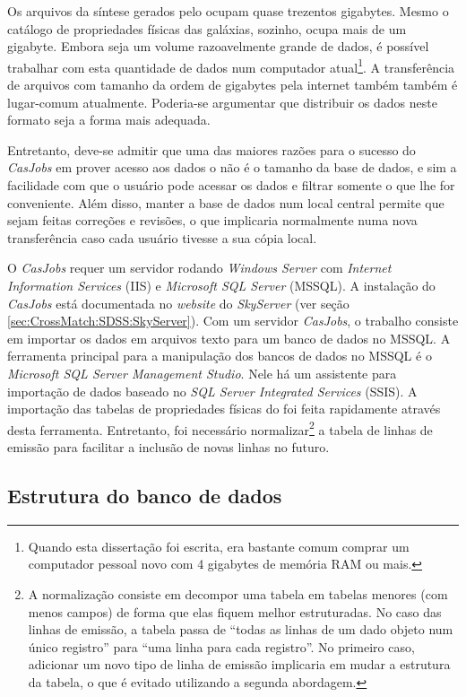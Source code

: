 Os arquivos da síntese gerados pelo \starlight ocupam quase trezentos gigabytes.
Mesmo o catálogo de propriedades físicas das galáxias, sozinho, ocupa mais de um
gigabyte. Embora seja um volume razoavelmente grande de dados, é possível
trabalhar com esta quantidade de dados num computador atual\footnote{Quando esta
dissertação foi escrita, era bastante comum comprar um computador pessoal novo
com 4 gigabytes de memória RAM ou mais.}. A transferência de arquivos com
tamanho da ordem de gigabytes pela internet também também é lugar-comum
atualmente. Poderia-se argumentar que distribuir os dados neste formato seja a
forma mais adequada.

Entretanto, deve-se admitir que uma das maiores razões para o sucesso do {\em
CasJobs} em prover acesso aos dados o \SDSS não é o tamanho da base de dados, e
sim a facilidade com que o usuário pode acessar os dados e filtrar somente o que
lhe for conveniente. Além disso, manter a base de dados num local central
permite que sejam feitas correções e revisões, o que implicaria normalmente numa
nova transferência caso cada usuário tivesse a sua cópia local.

O {\em CasJobs} requer um servidor rodando {\em Windows Server} com {\em
Internet Information Services} (IIS) e {\em Microsoft SQL Server} (MSSQL). A
instalação do {\em CasJobs} está documentada no {\em website} do {\em SkyServer}
(ver seção \ref{sec:CrossMatch:SDSS:SkyServer}). Com um servidor {\em CasJobs},
o trabalho consiste em importar os dados em arquivos texto para um banco de
dados no MSSQL. A ferramenta principal para a manipulação dos bancos de dados no
MSSQL é o {\em Microsoft SQL Server Management Studio}. Nele há um assistente
para importação de dados baseado no {\em SQL Server Integrated Services} (SSIS).
A importação das tabelas de propriedades físicas do \starlight foi feita
rapidamente através desta ferramenta. Entretanto, foi necessário
normalizar\footnote{A normalização consiste em decompor uma tabela em tabelas
menores (com menos campos) de forma que elas fiquem melhor estruturadas. No caso
das linhas de emissão, a tabela passa de ``todas as linhas de um dado objeto num
único registro'' para ``uma linha para cada registro''. No primeiro caso,
adicionar um novo tipo de linha de emissão implicaria em mudar a estrutura da
tabela, o que é evitado utilizando a segunda abordagem.} a tabela de linhas de
emissão para facilitar a inclusão de novas linhas no futuro.

\subsection{Estrutura do banco de dados}
\label{sec:Crossmatch:EstruturaBDStarlight}

